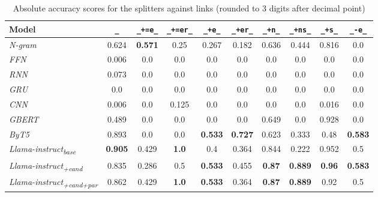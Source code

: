 \documentclass[11pt]{article}
\begin{document}
\begin{table}[htb!]
    \centering
    \renewcommand{\arraystretch}{1.02}
    \begin{tabular}{@{}lccccccccc@{}}
        \toprule
        Model & \texttt{\_} & \texttt{\_+=e\_} & \texttt{\_+=er\_} & \texttt{\_+e\_} & \texttt{\_+er\_} & \texttt{\_+n\_} & \texttt{\_+ns\_} & \texttt{\_+s\_} & \texttt{\_-e\_} \\ \midrule
        
        \textit{N-gram} & 0.624 & \textbf{0.571} & 0.25 & 0.267 & 0.182 & 0.636 & 0.444 & 0.816 & 0.0 \\ \cmidrule{1-10}
        
        \textit{FFN} & 0.006 & 0.0 & 0.0 & 0.0 & 0.0 & 0.0 & 0.0 & 0.0 & 0.0 \\
        
        \textit{RNN} & 0.073 & 0.0 & 0.0 & 0.0 & 0.0 & 0.0 & 0.0 & 0.0 & 0.0 \\
        
        \textit{GRU} & 0.0 & 0.0 & 0.0 & 0.0 & 0.0 & 0.0 & 0.0 & 0.0 & 0.0 \\
        
        \textit{CNN} & 0.006 & 0.0 & 0.125 & 0.0 & 0.0 & 0.0 & 0.0 & 0.016 & 0.0 \\ \cmidrule{1-10}
        
        \textit{GBERT} & 0.489 & 0.0 & 0.0 & 0.0 & 0.0 & 0.649 & 0.0 & 0.928 & 0.0 \\
        
        \textit{ByT5} & 0.893 & 0.0 & 0.0 & \textbf{0.533} & \textbf{0.727} & 0.623 & 0.333 & 0.48 & \textbf{0.583} \\ \midrule
        
        \textit{Llama-instruct\textsubscript{base}} & \textbf{0.905} & 0.429 & \textbf{1.0} & 0.4 & 0.364 & 0.844 & 0.222 & 0.952 & 0.5 \\
        
        \textit{Llama-instruct\textsubscript{+cand}} & 0.835 & 0.286 & 0.5 & \textbf{0.533} & 0.455 & \textbf{0.87} & \textbf{0.889} & \textbf{0.96} & \textbf{0.583} \\
        
        \textit{Llama-instruct\textsubscript{+cand+par}} & 0.862 & 0.429 & \textbf{1.0} & \textbf{0.533} & 0.364 & \textbf{0.87} & \textbf{0.889} & 0.92 & 0.5 \\
        
        \bottomrule
    \end{tabular}
    \caption{Absolute accuracy scores for the splitters against links (rounded to 3 digits after decimal point)}
    \label{tab:metrics_by_links}
\end{table}
\end{document}
